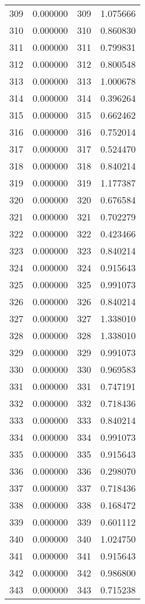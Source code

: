 \documentclass[12pt]{article}
\begin{document}
\begin{longtable}{@{}cccc@{}}
309 & 0.000000 & 309 & 1.075666 \\
310 & 0.000000 & 310 & 0.860830 \\
311 & 0.000000 & 311 & 0.799831 \\
312 & 0.000000 & 312 & 0.800548 \\
313 & 0.000000 & 313 & 1.000678 \\
314 & 0.000000 & 314 & 0.396264 \\
315 & 0.000000 & 315 & 0.662462 \\
316 & 0.000000 & 316 & 0.752014 \\
317 & 0.000000 & 317 & 0.524470 \\
318 & 0.000000 & 318 & 0.840214 \\
319 & 0.000000 & 319 & 1.177387 \\
320 & 0.000000 & 320 & 0.676584 \\
321 & 0.000000 & 321 & 0.702279 \\
322 & 0.000000 & 322 & 0.423466 \\
323 & 0.000000 & 323 & 0.840214 \\
324 & 0.000000 & 324 & 0.915643 \\
325 & 0.000000 & 325 & 0.991073 \\
326 & 0.000000 & 326 & 0.840214 \\
327 & 0.000000 & 327 & 1.338010 \\
328 & 0.000000 & 328 & 1.338010 \\
329 & 0.000000 & 329 & 0.991073 \\
330 & 0.000000 & 330 & 0.969583 \\
331 & 0.000000 & 331 & 0.747191 \\
332 & 0.000000 & 332 & 0.718436 \\
333 & 0.000000 & 333 & 0.840214 \\
334 & 0.000000 & 334 & 0.991073 \\
335 & 0.000000 & 335 & 0.915643 \\
336 & 0.000000 & 336 & 0.298070 \\
337 & 0.000000 & 337 & 0.718436 \\
338 & 0.000000 & 338 & 0.168472 \\
339 & 0.000000 & 339 & 0.601112 \\
340 & 0.000000 & 340 & 1.024750 \\
341 & 0.000000 & 341 & 0.915643 \\
342 & 0.000000 & 342 & 0.986800 \\
343 & 0.000000 & 343 & 0.715238 \\

\end{longtable}
\end{document}
